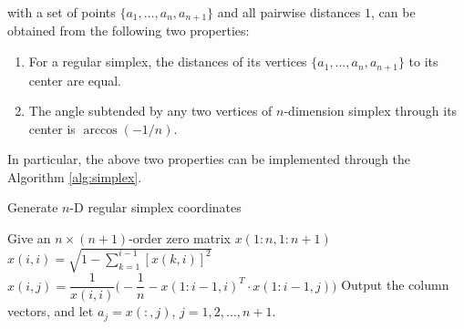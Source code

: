 \documentclass[final,1p,times]{elsarticle}
\begin{document}
with a set of points $\{a_1,\dots,a_n,a_{n+1}\}$
and all pairwise distances $1$,
can be obtained from the following two properties:
\begin{enumerate}
	\item For a regular simplex, the distances of its vertices 
		$\{a_1,\dots,a_n,a_{n+1}\}$ to its center are equal.
	\item The angle subtended by any two vertices of $n$-dimension simplex through its center is
		$\arccos(-1/n)$.
\end{enumerate}
In particular, the above two properties can be implemented
through the Algorithm \ref{alg:simplex}.
\begin{algorithm}
	\caption{Generate $n$-D regular simplex coordinates} 
	\label{alg:simplex}
\begin{algorithmic}
	\STATE Give an $n\times(n+1)$-order zero matrix $x(1:n,1:n+1)$
	\STATE $x(i,i)=\sqrt{1-\sum_{k=1}^{i-1} [x(k, i)]^{2}}$
		\STATE $x(i,j)
		=\dfrac{1}{x(i,i)}\Big(-\dfrac{1}{n}-x(1:i-1, i)^T \cdot
		x(1:i-1, j)\Big)$
		\ENDFOR
	\ENDFOR
	\STATE Output the column vectors, and let $a_j=x(:,j)$,
	$j=1,2,\dots,n+1$. 
\end{algorithmic}
\end{algorithm}
\end{document}
